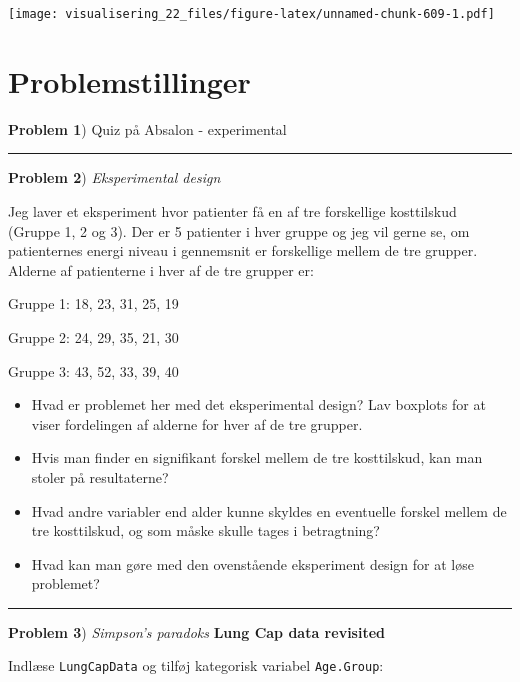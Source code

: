 \documentclass[
]{book}
\providecommand{\tightlist}{%
  \setlength{\itemsep}{0pt}\setlength{\parskip}{0pt}}
\begin{document}
\texttt{[image: visualisering\_22\_files/figure-latex/unnamed-chunk-609-1.pdf]}

\hypertarget{problemstillinger-10}{%
\section{Problemstillinger}\label{problemstillinger-10}}

\textbf{Problem 1}) Quiz på Absalon - experimental

\begin{center}\rule{0.5\linewidth}{0.5pt}\end{center}

\textbf{Problem 2}) \emph{Eksperimental design}

Jeg laver et eksperiment hvor patienter få en af tre forskellige kosttilskud (Gruppe 1, 2 og 3). Der er 5 patienter i hver gruppe og jeg vil gerne se, om patienternes energi niveau i gennemsnit er forskellige mellem de tre grupper. Alderne af patienterne i hver af de tre grupper er:

Gruppe 1: 18, 23, 31, 25, 19

Gruppe 2: 24, 29, 35, 21, 30

Gruppe 3: 43, 52, 33, 39, 40

\begin{itemize}
\tightlist
\item
  Hvad er problemet her med det eksperimental design? Lav boxplots for at viser fordelingen af alderne for hver af de tre grupper.
\item
  Hvis man finder en signifikant forskel mellem de tre kosttilskud, kan man stoler på resultaterne?
\item
  Hvad andre variabler end alder kunne skyldes en eventuelle forskel mellem de tre kosttilskud, og som måske skulle tages i betragtning?
\item
  Hvad kan man gøre med den ovenstående eksperiment design for at løse problemet?
\end{itemize}

\begin{center}\rule{0.5\linewidth}{0.5pt}\end{center}

\textbf{Problem 3}) \emph{Simpson's paradoks} \textbf{Lung Cap data revisited}

Indlæse \texttt{LungCapData} og tilføj kategorisk variabel \texttt{Age.Group}:
\end{document}
